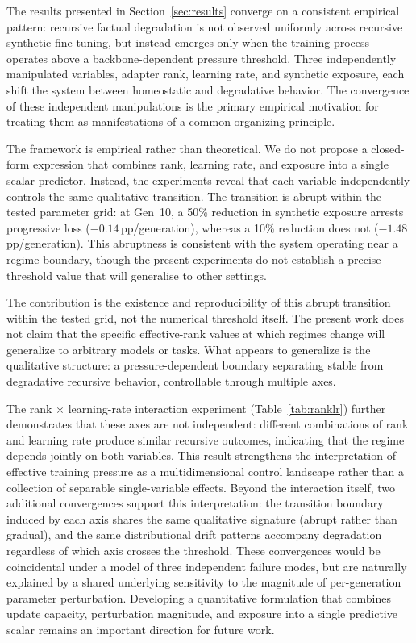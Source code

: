 \documentclass[a4paper,fleqn]{cas-dc}
\newif\ifshowchanges
\newcommand{\rev}[1]{\ifshowchanges{\color{blue}#1}\else{#1}\fi}
\begin{document}
The results presented in Section~\ref{sec:results} converge on a consistent
empirical pattern: recursive factual degradation is not observed uniformly
across recursive synthetic fine-tuning, but instead emerges only when the
training process operates above a backbone-dependent pressure threshold. Three
independently manipulated variables, adapter rank, learning rate, and synthetic
exposure, each shift the system between homeostatic and degradative behavior.
The convergence of these independent manipulations is the primary empirical
motivation for treating them as manifestations of a common organizing principle.

The framework is empirical rather than theoretical. We do not propose a
closed-form expression that combines rank, learning rate, and exposure into a
single scalar predictor. Instead, the experiments reveal that each variable independently
controls the same qualitative transition. \rev{The transition is abrupt within the tested
parameter grid: at Gen~10, a 50\% reduction in synthetic exposure arrests progressive
loss ($-0.14$\,pp/generation), whereas a 10\% reduction does not
($-1.48$\,pp/generation). This abruptness is consistent with the system operating
near a regime boundary, though the present experiments do not establish a
precise threshold value that will generalise to other settings.}

\rev{The contribution is the existence and reproducibility of this
abrupt transition within the tested grid, not the numerical threshold itself.} The present work does not claim that the
specific effective-rank values at which regimes change will generalize to
arbitrary models or tasks. What appears to generalize is the qualitative
structure: a pressure-dependent boundary separating stable from degradative
recursive behavior, controllable through multiple axes.

The rank $\times$ learning-rate interaction experiment
(Table~\ref{tab:ranklr}) further demonstrates that these axes are not
independent: different combinations of rank and learning rate produce similar
recursive outcomes, indicating that the regime depends jointly on both variables.
This result strengthens the interpretation of effective training pressure as a
multidimensional control landscape rather than a collection of separable
single-variable effects. Beyond the interaction itself, two additional
convergences support this interpretation:
the transition boundary induced by each axis shares the same qualitative
signature (abrupt rather than gradual), and the same distributional drift patterns
accompany degradation regardless of which axis crosses the threshold. These
convergences would be coincidental under a model of three independent failure
modes, but are naturally explained by a shared underlying sensitivity to the
magnitude of per-generation parameter perturbation. Developing a quantitative
formulation that combines update capacity, perturbation magnitude, and exposure
into a single predictive scalar remains an important direction for future work.
\end{document}
